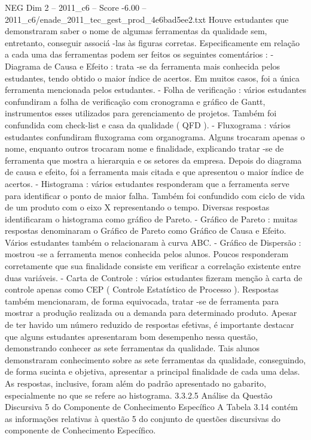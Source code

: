\begin{textsample}{NEG Dim 2 – 2011\_c6 – Score -6.00 – 2011\_c6/enade\_2011\_tec\_gest\_prod\_4e6bad5ee2.txt}
Houve estudantes que demonstraram saber o nome de algumas ferramentas da qualidade sem, entretanto, conseguir associá -las às figuras corretas.
Especificamente em relação a cada uma das ferramentas podem ser feitos os seguintes comentários : - Diagrama de Causa e Efeito : trata -se da ferramenta mais conhecida pelos estudantes, tendo obtido o maior índice de acertos.
Em muitos casos, foi a única ferramenta mencionada pelos estudantes. - Folha de verificação : vários estudantes confundiram a folha de verificação com cronograma e gráfico de Gantt, instrumentos esses utilizados para gerenciamento de projetos.
Também foi confundida com check-list e casa da qualidade ( QFD ). - Fluxograma : vários estudantes confundiram fluxograma com organograma.
Alguns trocaram apenas o nome, enquanto outros trocaram nome e finalidade, explicando tratar -se de ferramenta que mostra a hierarquia e os setores da empresa.
Depois do diagrama de causa e efeito, foi a ferramenta mais citada e que apresentou o maior índice de acertos. - Histograma : vários estudantes responderam que a ferramenta serve para identificar o ponto de maior falha.
Também foi confundido com ciclo de vida de um produto com o eixo X representando o tempo.
Diversas respostas identificaram o histograma como gráfico de Pareto. - Gráfico de Pareto : muitas respostas denominaram o Gráfico de Pareto como Gráfico de Causa e Efeito.
Vários estudantes também o relacionaram à curva ABC. - Gráfico de Dispersão : mostrou -se a ferramenta menos conhecida pelos alunos.
Poucos responderam corretamente que sua finalidade consiste em verificar a correlação existente entre duas variáveis. - Carta de Controle : vários estudantes fizeram menção à carta de controle apenas como CEP ( Controle Estatístico de Processo ).
Respostas também mencionaram, de forma equivocada, tratar -se de ferramenta para mostrar a produção realizada ou a demanda para determinado produto.
Apesar de ter havido um número reduzido de respostas efetivas, é importante destacar que alguns estudantes apresentaram bom desempenho nessa questão, demonstrando conhecer as sete ferramentas da qualidade.
Tais alunos demonstraram conhecimento sobre as sete ferramentas da qualidade, conseguindo, de forma sucinta e objetiva, apresentar a principal finalidade de cada uma delas.
As respostas, inclusive, foram além do padrão apresentado no gabarito, especialmente no que se refere ao histograma. 3.3.2.5 Análise da Questão Discursiva 5 do Componente de Conhecimento Específico A Tabela 3.14 contém as informações relativas à questão 5 do conjunto de questões discursivas do componente de Conhecimento Específico.

\end{textsample}
